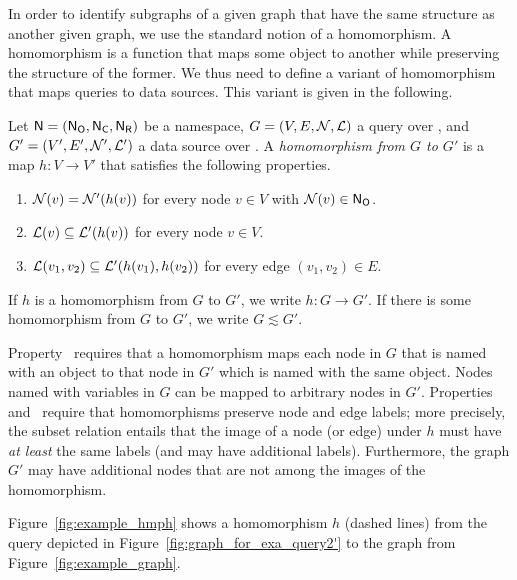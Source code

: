 In order to identify subgraphs of a given graph that have the same structure as another given graph,
we use the standard notion of a homomorphism.
A homomorphism is a function that maps some object to another
while preserving the structure of the former.
We thus need to define a variant of homomorphism that maps queries
to data sources. This variant is given in the following.
%
\begin{definition}
  \label{def:hmph}
  Let $\textup{\textsf{N}}=(\mathsf{N}_\mathsf{O},\mathsf{N}_\mathsf{C},\mathsf{N}_\mathsf{R})$ be a namespace, $G = (V,E,\mathcal{N},\mathcal{L})$ a query over \namespace,
  and $G' = (V',E',\mathcal{N}',\mathcal{L}')$ a data source over \namespace.
  A \emph{homomorphism from $G$ to $G'$} is a map $h : V \to V'$ that satisfies the following properties.
  \begin{enumerate}
    \item[\hmph{1}]
      $\mathcal{N}(v) = \mathcal{N}'(h(v))$ for every node $v \in V$ with $\mathcal{N}(v) \in \mathsf{N}_\mathsf{O}$.
    \item[\hmph{2}]
      $\mathcal{L}(v) \subseteq \mathcal{L}'(h(v))$ for every node $v \in V$.
    \item[\hmph{3}]
      $\mathcal{L}(v_1, v_2) \subseteq \mathcal{L}'(h(v_1), h(v_2))$
      for every edge $(v_1,v_2) \in E$.
  \end{enumerate}
  If $h$ is a homomorphism from $G$ to $G'$, we write $h : G \to G'$.
  If there is some homomorphism from $G$ to $G'$, we write $G \lesssim G'$.
\end{definition}
%
Property~ requires that a homomorphism maps each node in $G$ that is named with an object
to that node in $G'$ which is named with the same object.
Nodes named with variables in $G$ can be mapped to arbitrary nodes in $G'$.
Properties~ and~ require that homomorphisms preserve node and edge labels;
more precisely, the subset relation entails that the image of a node (or edge) under $h$
must have \emph{at least} the same labels (and may have additional labels).
Furthermore, the graph $G'$ may have additional nodes that are not among the images
of the homomorphism.

Figure~\ref{fig:example_hmph} shows a homomorphism $h$ (dashed lines)
from the query depicted in Figure~\ref{fig:graph_for_exa_query2'}
to the graph from Figure~\ref{fig:example_graph}.

